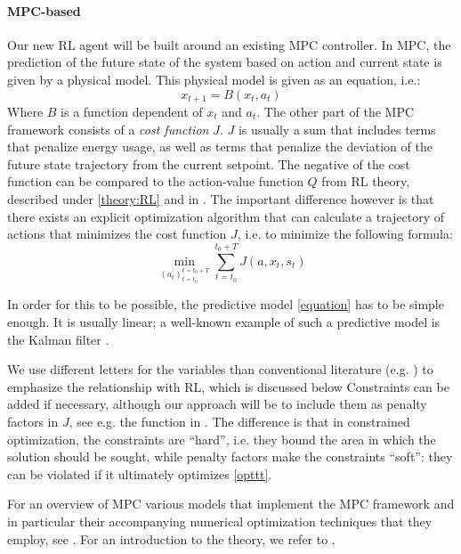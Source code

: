 \documentclass{article}
\theoremstyle{definition}
\theoremstyle{remark}
\begin{document}
\paragraph{MPC-based}
Our new RL agent will be built around an existing MPC controller. In MPC, the prediction of the future state of the system based on action and current state is given by a physical model. This physical model is given as an equation, i.e.:
\begin{equation}\label{equation}
    x_{t+1} = B(x_t,a_t)
\end{equation} 
Where $B$ is a function dependent of $x_t$ and $a_t$. 
The other part of the MPC framework consists of a \textit{cost function} $J$. $J$ is usually a sum that includes terms that penalize energy usage, as well as terms that penalize the deviation of the future state trajectory from the current setpoint. The negative of the cost function can be compared to the action-value function $Q$ from RL theory, described under \ref{theory:RL} and in \cite{suttonbarto2018, Szepesvari2010}. The important difference however is that there exists an explicit optimization algorithm that can calculate a trajectory of actions that minimizes the cost function $J$, i.e. to minimize the following formula:
\begin{equation}\label{opttt}
    \min_{(a_t)_{t=t_0}^{t=t_0+T}} \sum_{t=t_0}^{t_0+T}J(a, x_t, s_t)
\end{equation}


In order for this to be possible, the predictive model \ref{equation} has to be simple enough. It is usually linear; a well-known example of such a predictive model is the Kalman filter \cite{kalman1960contributions}.


We use different letters for the variables than conventional literature (e.g. \cite{Schwenzer_Ay_Bergs_Abel_2021}) to emphasize the relationship with RL, which is discussed below
Constraints can be added if necessary, although our approach will be to include them as penalty factors in $J$, see e.g. the function in \cite{privara2011modeling}. The difference is that in constrained optimization, the constraints are ``hard'', i.e. they bound the area in which the solution should be sought, while penalty factors make the constraints ``soft'': they can be violated if it ultimately optimizes \ref{opttt}. 

For an overview of MPC various models that implement the MPC framework and in particular their accompanying numerical optimization techniques that they employ, see \cite{QIN2003733}. For an introduction to the theory, we refer to \cite{rawlings2000tutorial}.
\end{document}
